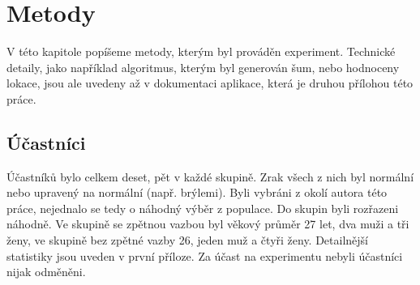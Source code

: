 \chapter{Metody}

V této kapitole popíšeme metody, kterým byl prováděn experiment. Technické detaily,
jako například algoritmus, kterým byl generován šum, nebo hodnoceny lokace, jsou
ale uvedeny až v dokumentaci aplikace, která je druhou přílohou této práce.

\section{Účastníci}

Účastníků bylo celkem deset, pět v každé
skupině. Zrak všech z nich byl normální nebo upravený na normální (např.
brýlemi). Byli vybráni z okolí autora této práce, nejednalo se tedy o náhodný
výběr z populace. Do skupin byli rozřazeni náhodně. Ve skupině se zpětnou
vazbou byl věkový průměr 27 let, dva muži a tři ženy, ve skupině bez zpětné
vazby 26, jeden muž a čtyři ženy. Detailnější statistiky jsou uveden v první
příloze. Za účast na experimentu nebyli účastníci nijak odměněni.

